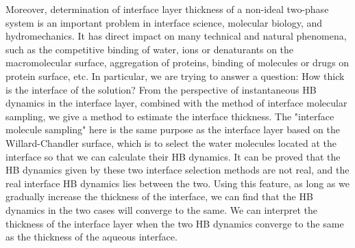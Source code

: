 Moreover, determination of interface layer thickness of a non-ideal two-phase system is an important problem in interface science, molecular biology, 
and hydromechanics.\cite{LiZhihong2001,Goharzadeh2005,Bano2006} It has direct impact on many technical and natural phenomena, 
such as the competitive binding of water, ions or denaturants on the macromolecular surface\cite{Arakawa1985,Timasheff2002}, 
aggregation of proteins\cite{Webb2001}, binding of molecules or drugs on protein surface\cite{Hritz2004}, etc. 
In particular, we are trying to answer a question: How thick is the interface of the solution? 
From the perspective of instantaneous HB dynamics in the interface layer, combined with the method of interface molecular sampling, we give a method to estimate the interface thickness. The "interface molecule sampling" here is the same purpose as the interface layer based on the Willard-Chandler surface, which is to select the water molecules located at the interface so that we can calculate their HB dynamics. It can be proved that the HB dynamics given by these two interface selection methods are not real, and the real interface HB dynamics lies between the two. Using this feature, as long as we gradually increase the thickness of the interface, we can find that the HB dynamics in the two cases will converge to the same. We can interpret the thickness of the interface layer when the two HB dynamics converge to the same as the thickness of the aqueous interface.
 


